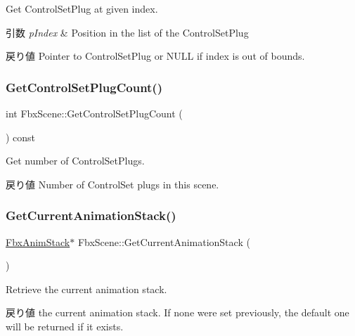Get Control\+Set\+Plug at given index. 
\begin{DoxyParams}{引数}
{\em p\+Index} & Position in the list of the Control\+Set\+Plug \\
\hline
\end{DoxyParams}
\begin{DoxyReturn}{戻り値}
Pointer to Control\+Set\+Plug or {\ttfamily N\+U\+LL} if index is out of bounds. 
\end{DoxyReturn}
\mbox{\label{class_fbx_scene_a03a1a3f0153d9aa882eaa9c550fd9127}} 
\subsubsection{\texorpdfstring{Get\+Control\+Set\+Plug\+Count()}{GetControlSetPlugCount()}}
{\footnotesize\ttfamily int Fbx\+Scene\+::\+Get\+Control\+Set\+Plug\+Count (\begin{DoxyParamCaption}{ }\end{DoxyParamCaption}) const}

Get number of Control\+Set\+Plugs. \begin{DoxyReturn}{戻り値}
Number of Control\+Set plugs in this scene. 
\end{DoxyReturn}
\mbox{\label{class_fbx_scene_af8fde6643714a5e654e1e28d6f5470f9}} 
\subsubsection{\texorpdfstring{Get\+Current\+Animation\+Stack()}{GetCurrentAnimationStack()}}
{\footnotesize\ttfamily \hyperlink{class_fbx_anim_stack}{Fbx\+Anim\+Stack}$\ast$ Fbx\+Scene\+::\+Get\+Current\+Animation\+Stack (\begin{DoxyParamCaption}{ }\end{DoxyParamCaption})}

Retrieve the current animation stack. \begin{DoxyReturn}{戻り値}
the current animation stack. If none were set previously, the default one will be returned if it exists. 
\end{DoxyReturn}
\mbox{\label{class_fbx_scene_a7dd5c89cc0d60a42ce504b2593f781cb}} 

